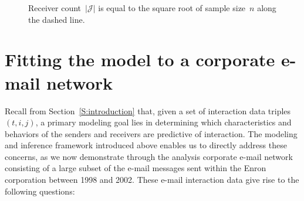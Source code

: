 \documentclass[final]{statsoc}
\begin{document}
\begin{figure}
  \centering
  \caption{
	Receiver count~$|\mathcal{J}|$ is equal to the square root of sample size~$n$
	along the dashed line.
  }\label{F:multicast-error}
\end{figure}



\section{Fitting the model to a corporate e-mail network}\label{S:enron-modeling}

Recall from Section~\ref{S:introduction} that, given a set of interaction data triples $(t,i,j)$, a primary modeling goal lies in determining which characteristics and behaviors of the senders and receivers are predictive of interaction.  The modeling and inference framework introduced above enables us to directly address these concerns, as we now demonstrate through the analysis corporate e-mail network consisting of a large subset of the e-mail messages sent within the Enron corporation between 1998 and 2002.  These e-mail interaction data give rise to the following questions:
\end{document}
